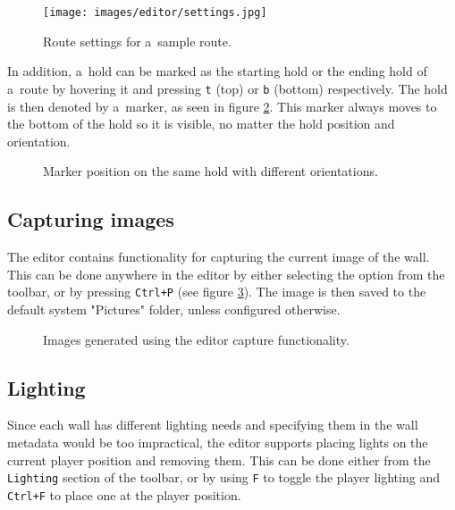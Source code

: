 \begin{figure}[t]
	\centering
	\texttt{[image: images/editor/settings.jpg]}
	\caption{Route settings for a~sample route.}%
	\label{fig:routesettings}
\end{figure}

In addition, a~hold can be marked as the starting hold or the ending hold of a~route by hovering it and pressing \verb|t| (top) or \verb|b| (bottom) respectively.
The hold is then denoted by a~marker, as seen in figure \ref{ref:topbotmarkers}.
This marker always moves to the bottom of the hold so it is visible, no matter the hold position and orientation.

\begin{figure}[h]
	\centering
	\hfill
	\hfill
	\hfill
	\caption{Marker position on the same hold with different orientations.}%
	\label{ref:topbotmarkers}
\end{figure}

\subsection{Capturing images}
The editor contains functionality for capturing the current image of the wall.
This can be done anywhere in the editor by either selecting the option from the toolbar, or by pressing \verb|Ctrl+P| (see figure \ref{fig:capture}).
The image is then saved to the default system "Pictures" folder, unless configured otherwise.

\begin{figure}[h]
	\centering
	\hfill
	\caption{Images generated using the editor capture functionality.}%
	\label{fig:capture}
\end{figure}

\subsection{Lighting}
Since each wall has different lighting needs and specifying them in the wall metadata would be too impractical, the editor supports placing lights on the current player position and removing them.
This can be done either from the \verb|Lighting| section of the toolbar, or by using \verb|F| to toggle the player lighting and \verb|Ctrl+F| to place one at the player position.

